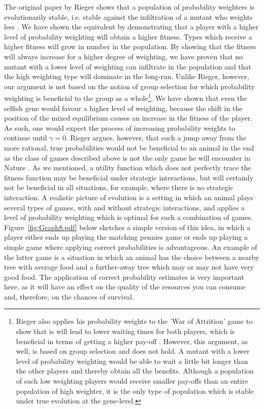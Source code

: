 \documentclass[a4paper,10pt]{article}
\numberwithin{equation}{section}
\begin{document}
The original paper by Rieger shows that a population of probability weighters is evolutionarily stable, i.e. stable against the infiltration of a mutant who weights less \cite{Rieger2009}. We have shown the equivalent by demonstrating that a player with a higher level of probability weighting will obtain a higher fitness. Types which receive a higher fitness will grow in number in the population. By showing that the fitness will always increase for a higher degree of weighting, we have proven that no mutant with a lower level of weighting can infiltrate in the population and that the high weighting type will dominate in the long-run. Unlike Rieger, however, our argument is not based on the notion of group selection for which probability weighting is beneficial to the group as a whole\footnote{Rieger also applies his probability weights to the 'War of Attrition' game to show that is will lead to lower waiting times for both players, which is beneficial in terms of getting a higher pay-off \cite{Rieger2009}. However, this argument, as well, is based on group selection and does not hold. A mutant with a lower level of probability weighting would be able to wait a little bit longer than the other players and thereby obtain all the benefits. Although a population of such low weighting players would receive smaller pay-offs than an entire population of high weighter, it is the only type of population which is stable under true evolution at the gene-level.}. We have shown that even the selfish gene would favour a higher level of weighting, because the shift in the position of the mixed equilibrium causes an increase in the fitness of the player. As such, one would expect the process of increasing probability weights to continue until $\gamma=0$. Rieger argues, however, that such a jump away from the more rational, true probabilities would not be beneficial to an animal in the end as the class of games described above is not the only game he will encounter in Nature \cite{Rieger2009}. As we mentioned, a utility function which does not perfectly trace the fitness function may be beneficial under strategic interactions, but will certainly not be beneficial in all situations, for example, where there is no strategic interaction. A realistic picture of evolution is a setting in which an animal plays several types of games, with and without strategic interactions, and applies a level of probability weighting which is optimal for such a combination of games. Figure~\ref{fig:Graph8.pdf} below sketches a simple version of this idea, in which a player either ends up playing the matching pennies game or ends up playing a simple game where applying correct probabilities is advantageous. An example of the latter game is a situation in which an animal has the choice between a nearby tree with average food and a further-away tree which may or may not have very good food. The application of correct probability estimates is very important here, as it will have an effect on the quality of the resources you can consume and, therefore, on the chances of survival.
\end{document}
